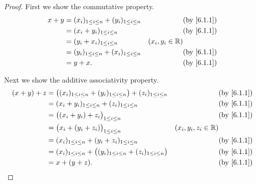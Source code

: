 \begin{proof}
  First we show the commutative property.
  \begin{align*}
    x + y & = (x_i)_{1 \leq i \leq n} + (y_i)_{1 \leq i \leq n} &                   & \text{(by \cref{6.1.1})} \\
          & = (x_i + y_i)_{1 \leq i \leq n}                     &                   & \text{(by \cref{6.1.1})} \\
          & = (y_i + x_i)_{1 \leq i \leq n}                     & (x_i, y_i \in \R)                            \\
          & = (y_i)_{1 \leq i \leq n} + (x_i)_{1 \leq i \leq n} &                   & \text{(by \cref{6.1.1})} \\
          & = y + x.                                            &                   & \text{(by \cref{6.1.1})}
  \end{align*}

  Next we show the additive associativity property.
  \begin{align*}
    (x + y) + z & = \big((x_i)_{1 \leq i \leq n} + (y_i)_{1 \leq i \leq n}\big) + (z_i)_{1 \leq i \leq n} &                        & \text{(by \cref{6.1.1})} \\
                & = (x_i + y_i)_{1 \leq i \leq n} + (z_i)_{1 \leq i \leq n}                               &                        & \text{(by \cref{6.1.1})} \\
                & = \big((x_i + y_i) + z_i\big)_{1 \leq i \leq n}                                         &                        & \text{(by \cref{6.1.1})} \\
                & = \big(x_i + (y_i + z_i)\big)_{1 \leq i \leq n}                                         & (x_i, y_i, z_i \in \R)                            \\
                & = (x_i)_{1 \leq i \leq n} + (y_i + z_i)_{1 \leq i \leq n}                               &                        & \text{(by \cref{6.1.1})} \\
                & = (x_i)_{1 \leq i \leq n} + \big((y_i)_{1 \leq i \leq n} + (z_i)_{1 \leq i \leq n}\big) &                        & \text{(by \cref{6.1.1})} \\
                & = x + (y + z).                                                                          &                        & \text{(by \cref{6.1.1})}
  \end{align*}


\end{proof}
